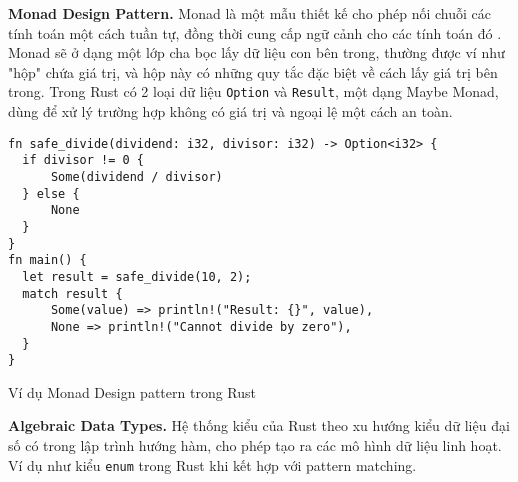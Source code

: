 \textbf{Monad Design Pattern.} Monad là một mẫu thiết kế cho phép nối chuỗi các tính toán một cách tuần tự, đồng thời cung cấp ngữ cảnh cho các tính toán đó \cite{gill2015remote}.
Monad sẽ ở dạng một lớp cha bọc lấy dữ liệu con bên trong, thường được ví như "hộp" chứa giá trị, và hộp này có những quy tắc đặc biệt về cách lấy giá trị bên trong.
Trong Rust có 2 loại dữ liệu \texttt{Option} và \texttt{Result}, một dạng Maybe Monad, dùng để xử lý trường hợp không có giá trị và ngoại lệ một cách an toàn.

\begin{listing}[H]
\begin{verbatim}
fn safe_divide(dividend: i32, divisor: i32) -> Option<i32> {
  if divisor != 0 {
      Some(dividend / divisor)
  } else {
      None
  }
}
fn main() {
  let result = safe_divide(10, 2);
  match result {
      Some(value) => println!("Result: {}", value),
      None => println!("Cannot divide by zero"),
  }
}
\end{verbatim}
\caption{Ví dụ Monad Design pattern trong Rust}
\label{code:fp_monad}
\end{listing}




\textbf{Algebraic Data Types.} Hệ thống kiểu của Rust theo xu hướng kiểu dữ liệu đại số có trong lập trình hướng hàm, cho phép tạo ra các mô hình dữ liệu linh hoạt.
Ví dụ như kiểu \texttt{enum} trong Rust khi kết hợp với pattern matching.

